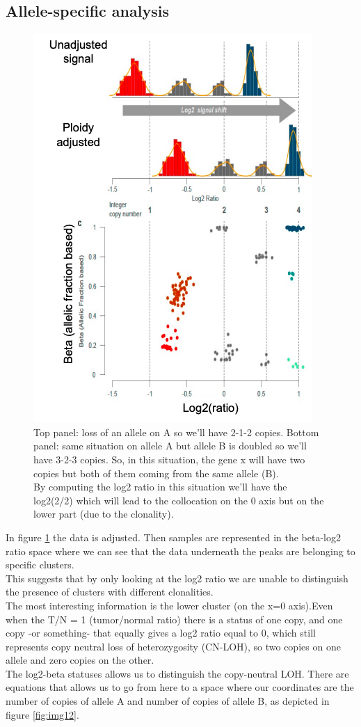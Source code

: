 \subsection{Allele-specific analysis}

\begin{figure}[H]
\centering
\includegraphics[width=0.5\linewidth]{image11.png}
\caption{Top panel: loss of an allele on A so we'll have 2-1-2 copies. Bottom panel: same situation on allele A but allele B is doubled so we'll have
3-2-3 copies. So, in this situation, the gene x will have two copies but both of them coming
from the same allele (B).
\\
By computing the log2 ratio in this situation we'll have the log2(2/2) which will lead to the collocation on the 0 axis but on the lower part (due to the clonality).}
\label{fig:img11}
\end{figure}

In figure \ref{fig:img11} the data is adjusted. Then samples are represented in the beta-log2 ratio space where we can see that the data underneath the peaks are belonging to specific clusters.
\\
This suggests that by only looking at the log2 ratio we are unable to distinguish the presence of clusters with different clonalities.
\\
The most interesting information is the lower cluster (on the x=0 axis).Even when the T/N = 1 (tumor/normal ratio) there is a status of one copy, and one copy -or something- that equally gives a log2 ratio equal to 0, which still represents copy neutral loss of heterozygosity (CN-LOH), so two copies on one allele and zero copies on the other.
\\
The log2-beta statuses allows us to distinguish the copy-neutral LOH. There are equations that allows us to go from here to a space where our coordinates are the number of copies of allele A and number of copies of allele B, as depicted in figure \ref{fig:img12}.

